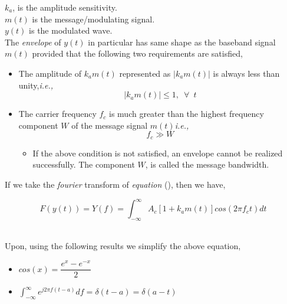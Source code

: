 \documentclass[12pt,a4paper]{article}%
\begin{document}
\begin{flushleft}
		$k_a$, is the amplitude sensitivity.\\
		$m(t)$ is the message/modulating signal.\\
		$y(t)$ is the modulated wave.\\\smallskip
		The \textit{envelope} of $y(t)$ in particular has same shape as the baseband signal $m(t)$ provided that the following two requirements are satisfied,
		\begin{itemize}
			\item{
				The amplitude of $k_a m(t)$ represented as $|k_a m(t)|$ is always less than unity,\textit{i.e.,}
				\begin{equation}
					|k_a m(t)| \leq 1,\enspace \forall \enspace t
				\end{equation}
			}
			\item{
				The carrier frequency $f_c$ is much greater than the highest frequency component $W$ of the message signal $m(t)$\textit{i.e.,}
				\begin{equation}
					f_c \gg W
				\end{equation}
				\begin{itemize}
					\item{If the above condition is not satisfied, an envelope cannot be realized successfully. The component $W$, is called the message bandwidth.}
				\end{itemize}
			}
		\end{itemize}
		
		If we take the \textit{fourier} transform of \textit{equation} (), then we have,
		
		\begin{center}
		$$F(y(t))=Y(f)=\int_{-\infty}^{\infty} A_c [1+k_a m(t)]cos(2 \pi f_c t) dt$$\\\smallskip
			\begin{flushleft}
				Upon, using the following results we simplify the above equation,\\\smallskip
			\end{flushleft}
			\begin{itemize}
				\item{$cos(x)=\dfrac{e^x-e^{-x}}{2}$}
				\item{$\int_{-\infty}^{\infty} e^{j 2 \pi f (t-a)} df=\delta (t-a)=\delta (a-t)$}
			\end{itemize}
			

\end{center}
\end{flushleft}
\end{document}

